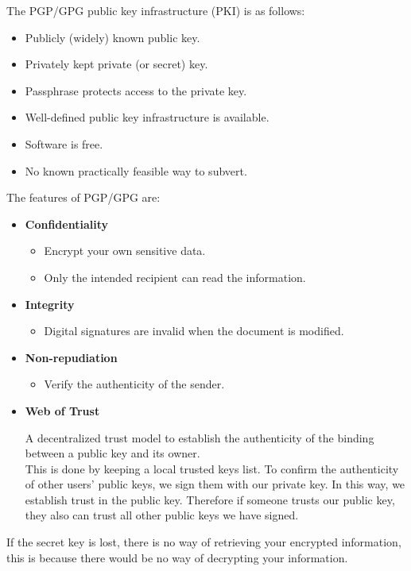 \documentclass[a4paper]{article}
\begin{document}
\noindent The PGP/GPG public key infrastructure (PKI) is as follows:
\begin{itemize}
    \item Publicly (widely) known public key.
    \item Privately kept private (or secret) key.
    \item Passphrase protects access to the private key.
    \item Well-defined public key infrastructure is available.
    \item Software is free.
    \item No known practically feasible way to subvert.
\end{itemize}
The features of PGP/GPG are:
\begin{itemize}
    \item \textbf{Confidentiality}
    \begin{itemize}[noitemsep,nolistsep]
        \item Encrypt your own sensitive data.
        \item Only the intended recipient can read the information.
    \end{itemize}
    \item \textbf{Integrity}
    \begin{itemize}[noitemsep,nolistsep]
        \item Digital signatures are invalid when the document is modified.
    \end{itemize}
    \item \textbf{Non-repudiation}
    \begin{itemize}[noitemsep,nolistsep]
        \item Verify the authenticity of the sender.
    \end{itemize}
    \item \textbf{Web of Trust}
    \begin{itemize}
        A decentralized trust model to establish the authenticity of the binding between a public key and its owner. \\
        This is done by keeping a local trusted keys list. To confirm the authenticity of other users' public keys, we sign them with our private key. In this way, we establish trust in the public key. Therefore if someone trusts our public key, they also can trust all other public keys we have signed.
    \end{itemize}
\end{itemize}

If the secret key is lost, there is no way of retrieving your encrypted information, this is because there would be no way of decrypting your information.
\end{document}
